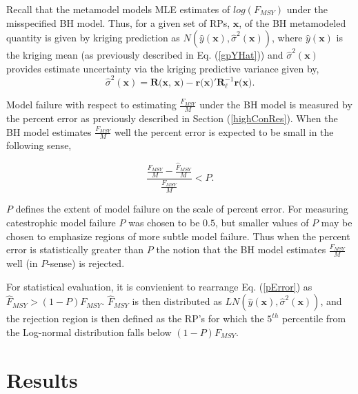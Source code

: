 %
\clearpage
%
Recall that the metamodel models MLE estimates of $log(F_{MSY})$ under the misspecified BH model.
Thus, for a given set of RPs, $\textbf{x}$, of the BH metamodeled
quantity is given by kriging prediction as $N(\hat y(\textbf{x}), \hat \sigma^2(\textbf{x}))$,
where $\hat y(\textbf{x})$ is the kriging mean (as previously described in
Eq. (\ref{gpYHat})) and $\hat \sigma^2(\textbf{x})$ provides estimate
uncertainty via the kriging predictive variance given by,
\begin{equation} %
       \hat \sigma^2(\textbf{x}) = \textbf{R(x, x)} - \textbf{r(x)}'\bm{R}^{-1}_{\bm{\ell}}\textbf{r(x)}.
\end{equation}

%
Model failure with respect to estimating $\frac{F_{MSY}}{M}$ under the BH
model is measured by the percent error as previously described in Section (\ref{highConRes}).
When the BH model estimates $\frac{F_{MSY}}{M}$ well the percent error is
expected to be small in the following sense,

%
\begin{equation}
\frac{\frac{F_{MSY}}{M}-\frac{\hat{F}_{MSY}}{M}}{\frac{F_{MSY}}{M}}<P. \label{pError}
\end{equation}

%
$P$ defines the extent of model failure on the scale of percent error. For
measuring catestrophic model failure $P$ was chosen to be $0.5$, but smaller values
of $P$ may be chosen to emphasize regions of more subtle model failure. %
%
Thus when the percent error is statistically greater than $P$ the notion that
the BH model estimates $\frac{F_{MSY}}{M}$ well (in $P$-sense) is rejected.

%
For statistical evaluation, it is convienient to rearrange Eq. (\ref{pError})
as \mbox{$\hat{F}_{MSY}>(1-P)F_{MSY}$}. $\hat{F}_{MSY}$ is then distributed as $LN(\hat y(\textbf{x}), \hat \sigma^2(\textbf{x}))$,
and the rejection region is then defined as the RP's for which the $5^{th}$ percentile
from the Log-normal distribution falls below \mbox{$(1-P)F_{MSY}$.}

%
%

%
\clearpage
\section{Results}

